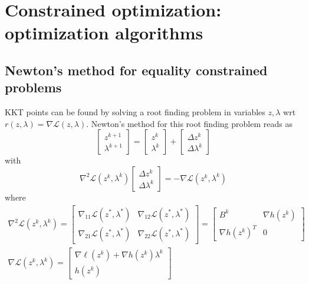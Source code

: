 \documentclass[openany]{book}
\theoremstyle{definition}
\theoremstyle{remark}
\begin{document}
\section{Constrained optimization: optimization algorithms}

\subsection{Newton's method for equality constrained problems}

KKT points can be found by solving a root finding problem in variables $z,\lambda$ wrt $r(z,\lambda)=\nabla \mathcal{L}(z,\lambda)$. Newton's method for this root finding problem reads as 
\[
    \begin{bmatrix}
        z^{k+1} \\ \lambda^{k+1}
        \end{bmatrix} = \begin{bmatrix}
        z^k \\ \lambda^k
        \end{bmatrix} + \begin{bmatrix}
        \Delta z^k \\ \Delta \lambda^k
    \end{bmatrix}
\]
with 
\[  \nabla^2 \mathcal{L}(z^k,\lambda^k)
    \begin{bmatrix}
        \Delta z^k \\ \Delta \lambda^k
    \end{bmatrix} = -\nabla \mathcal{L}(z^k,\lambda^k)
\]
where 
\begin{gather*}
    \nabla^2\mathcal{L}(z^k,\lambda^k)= \begin{bmatrix}
        \nabla_{11} \mathcal{L}(z^*,\lambda^*) & \nabla_{12} \mathcal{L}(z^*,\lambda^*)\\
        \nabla_{21} \mathcal{L}(z^*,\lambda^*) & \nabla_{22} \mathcal{L}(z^*,\lambda^*)
        \end{bmatrix} = \begin{bmatrix}
        B^k & \nabla h(z^k) \\
        \nabla h(z^k)^T & 0
        \end{bmatrix} \\ \nabla \mathcal{L}(z^k,\lambda^k) = \begin{bmatrix}
        \nabla \ell(z^k)+\nabla h(z^k)\lambda^k \\ h(z^k)
    \end{bmatrix}
\end{gather*}
\end{document}
